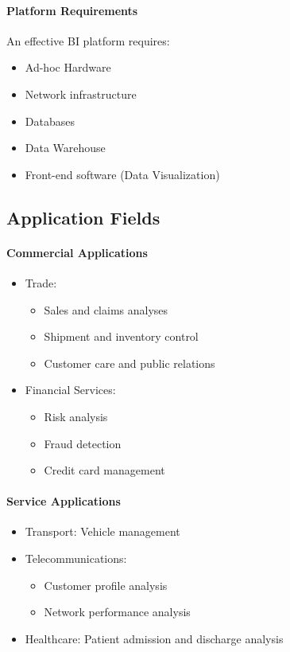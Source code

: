 \documentclass[a4paper,11pt]{article}
\begin{document}
\paragraph{Platform Requirements}
An effective BI platform requires:
\begin{itemize}
    \item Ad-hoc Hardware
    \item Network infrastructure
    \item Databases
    \item Data Warehouse
    \item Front-end software (Data Visualization)
\end{itemize}

\subsection{Application Fields}

\paragraph{Commercial Applications}
\begin{itemize}
    \item Trade:
        \begin{itemize}
            \item Sales and claims analyses
            \item Shipment and inventory control
            \item Customer care and public relations
        \end{itemize}
    \item Financial Services:
        \begin{itemize}
            \item Risk analysis
            \item Fraud detection
            \item Credit card management
        \end{itemize}
\end{itemize}

\paragraph{Service Applications}
\begin{itemize}
    \item Transport: Vehicle management
    \item Telecommunications:
        \begin{itemize}
            \item Customer profile analysis
            \item Network performance analysis
        \end{itemize}
    \item Healthcare: Patient admission and discharge analysis
\end{itemize}
\end{document}
